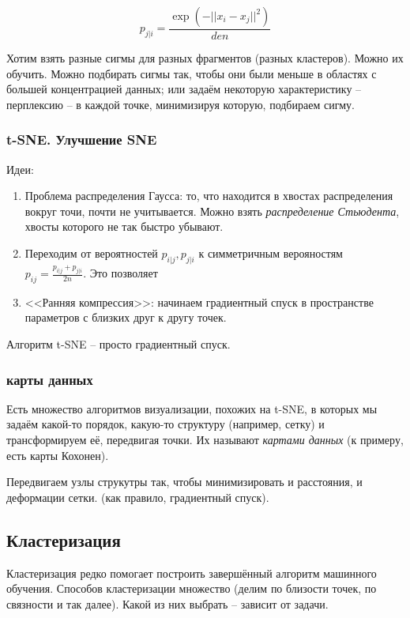 \documentclass[main.tex]{subfiles}
\begin{document}
$$ p_{j|i} = \frac{\exp(- || x_i - x_j ||^2)}{den} $$ %

Хотим взять разные сигмы для разных фрагментов (разных кластеров).
Можно их обучить.
Можно подбирать сигмы так, чтобы они были меньше в областях с большей концентрацией данных; или задаём некоторую характеристику -- перплексию -- в каждой точке, минимизируя которую, подбираем сигму.

\subsubsection{t-SNE. Улучшение SNE}

Идеи:

\begin{enumerate}[noitemsep]
	\item Проблема распределения Гаусса: то, что находится в хвостах распределения вокруг точи, почти не учитывается.
	Можно взять \emph{распределение Стьюдента}, хвосты которого не так быстро убывают.
	\item Переходим от вероятностей $ p_{i|j}, p_{j|i} $ к симметричным верояностям $ p_{ij} = \frac{p_{i|j} + p_{j|i}}{2n} $.
	Это позволяет
	\item <<Ранняя компрессия>>: начинаем градиентный спуск в пространстве параметров с близких друг к другу точек.
\end{enumerate}

Алгоритм t-SNE -- просто градиентный спуск.

\subsubsection{карты данных}

Есть множество алгоритмов визуализации, похожих на t-SNE, в которых мы задаём какой-то порядок, какую-то структуру (например, сетку) и трансформируем её, передвигая точки.
Их называют \emph{картами данных} (к примеру, есть карты Кохонен).

Передвигаем узлы струкутры так, чтобы минимизировать и расстояния, и деформации сетки. (как правило, градиентный спуск).

\subsection{Кластеризация}

Кластеризация редко помогает построить завершённый алгоритм машинного обучения.
Способов кластеризации множество (делим по близости точек, по связности и так далее).
Какой из них выбрать -- зависит от задачи.
\end{document}
